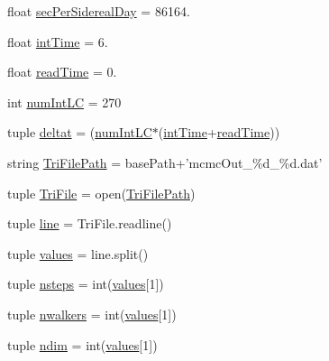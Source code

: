 \begin{DoxyCompactItemize}
\item 
float \hyperlink{namespace_plot_a_r_m_a_regions_a911f440b0b304e72e7588c7508cacd20}{sec\-Per\-Sidereal\-Day} = 86164.
\item 
float \hyperlink{namespace_plot_a_r_m_a_regions_a54e4c79468e19409c96e67dfdb482f0a}{int\-Time} = 6.
\item 
float \hyperlink{namespace_plot_a_r_m_a_regions_a5329612770d2afb1002bfc0672f392d8}{read\-Time} = 0.
\item 
int \hyperlink{namespace_plot_a_r_m_a_regions_a9a622e1006cc8cc55b062f42b9e4c980}{num\-Int\-L\-C} = 270
\item 
tuple \hyperlink{namespace_plot_a_r_m_a_regions_a7b437af6d1c5ce7f40b5f27233d5f4b1}{deltat} = (\hyperlink{namespace_plot_a_r_m_a_regions_a9a622e1006cc8cc55b062f42b9e4c980}{num\-Int\-L\-C}$\ast$(\hyperlink{namespace_plot_a_r_m_a_regions_a54e4c79468e19409c96e67dfdb482f0a}{int\-Time}+\hyperlink{namespace_plot_a_r_m_a_regions_a5329612770d2afb1002bfc0672f392d8}{read\-Time}))
\item 
string \hyperlink{namespace_plot_a_r_m_a_regions_a35b8724b6b0849cfed30c080d79c775e}{Tri\-File\-Path} = base\-Path+'mcmc\-Out\-\_\-\%d\-\_\-\%d.\-dat'
\item 
tuple \hyperlink{namespace_plot_a_r_m_a_regions_a418058aa77527961189e1d40f3d8091d}{Tri\-File} = open(\hyperlink{namespace_plot_a_r_m_a_regions_a35b8724b6b0849cfed30c080d79c775e}{Tri\-File\-Path})
\item 
tuple \hyperlink{namespace_plot_a_r_m_a_regions_a478b5b50b6eddf2098c4a31f8a83b86d}{line} = Tri\-File.\-readline()
\item 
tuple \hyperlink{namespace_plot_a_r_m_a_regions_a4e1eb2c62fce8e30d2ac6b5152291a8a}{values} = line.\-split()
\item 
tuple \hyperlink{namespace_plot_a_r_m_a_regions_a400da7acac41459d918d50e10fcd9735}{nsteps} = int(\hyperlink{namespace_plot_a_r_m_a_regions_a4e1eb2c62fce8e30d2ac6b5152291a8a}{values}\mbox{[}1\mbox{]})
\item 
tuple \hyperlink{namespace_plot_a_r_m_a_regions_ad8d2b4da6dbf7506bdf2e3ae4a66e626}{nwalkers} = int(\hyperlink{namespace_plot_a_r_m_a_regions_a4e1eb2c62fce8e30d2ac6b5152291a8a}{values}\mbox{[}1\mbox{]})
\item 
tuple \hyperlink{namespace_plot_a_r_m_a_regions_a6d9523e891d3f88e36e2c83da27f05a9}{ndim} = int(\hyperlink{namespace_plot_a_r_m_a_regions_a4e1eb2c62fce8e30d2ac6b5152291a8a}{values}\mbox{[}1\mbox{]})

\end{DoxyCompactItemize}
